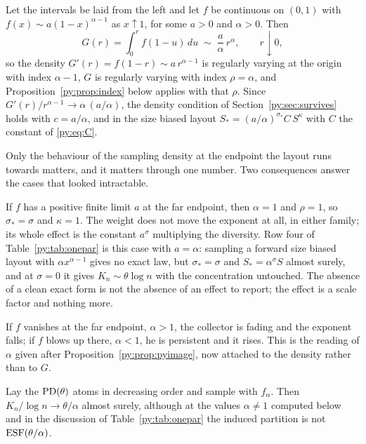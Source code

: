 \begin{proposition}
\label{py:prop:contact}
Let the intervals be laid from the left and let $f$ be continuous on $(0,1)$ with
$f(x) \sim a(1-x)^{\alpha-1}$ as $x \uparrow 1$, for some $a > 0$ and $\alpha > 0$. Then
\[
G(r) = \int_0^r f(1-u)\,du \;\sim\; \frac{a}{\alpha}\,r^{\alpha},
\qquad r \downarrow 0,
\]
so the density $G'(r) = f(1-r) \sim a\,r^{\alpha-1}$ is regularly varying at the origin with index
$\alpha-1$, $G$ is regularly varying with index $\rho = \alpha$, and
Proposition~\ref{py:prop:index} below applies with that $\rho$. Since $G'(r)/r^{\alpha-1} \to \alpha\,(a/\alpha)$,
the density condition of Section~\ref{py:sec:survives} holds with $c = a/\alpha$, and in the size biased layout
$S_* = (a/\alpha)^{\sigma_*}C\,S^{\kappa}$ with $C$ the constant of \eqref{py:eq:C}.
\end{proposition}

Only the behaviour of the sampling density at the endpoint the layout runs towards matters, and it
matters through one number. Two consequences answer the cases that looked intractable.

If $f$ has a positive finite limit $a$ at the far endpoint, then $\alpha = 1$ and $\rho = 1$, so
$\sigma_* = \sigma$ and $\kappa = 1$. The weight does not move the exponent at all, in either
family; its whole effect is the constant $a^{\sigma}$ multiplying the diversity. Row four of
Table~\ref{py:tab:onepar} is this case with $a = \alpha$: sampling a forward size biased layout with
$\alpha x^{\alpha-1}$ gives no exact law, but $\sigma_* = \sigma$ and $S_* = \alpha^{\sigma}S$
almost surely, and at $\sigma = 0$ it gives $K_n \sim \theta\log n$ with the concentration
untouched. The absence of a clean exact form is not the absence of an effect to report; the effect
is a scale factor and nothing more.

If $f$ vanishes at the far endpoint, $\alpha > 1$, the collector is fading and the exponent falls;
if $f$ blows up there, $\alpha < 1$, he is persistent and it rises. This is the reading of $\alpha$
given after Proposition~\ref{py:prop:pyimage}, now attached to the density rather than to $G$.

\begin{proposition}[The ranked layout at $\sigma = 0$]
\label{py:prop:ranked0}
Lay the $\mathrm{PD}(\theta)$ atoms in decreasing order and sample with $f_\alpha$. Then
$K_n/\log n \to \theta/\alpha$ almost surely, although at the values $\alpha \neq 1$ computed below
and in the discussion of Table~\ref{py:tab:onepar} the induced partition is not $\mathrm{ESF}(\theta/\alpha)$.
\end{proposition}


